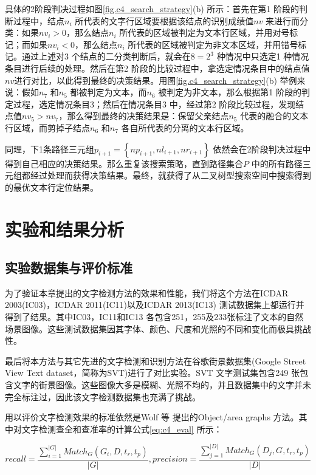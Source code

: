         具体的2阶段判决过程如图\ref{fig.c4_search_strategy}(b) 所示：首先在第1 阶段的判断过程中，结点$n_i$ 所代表的文字行区域要根据该结点的识别成绩值$nv$ 来进行而分类：如果$nv_i>0$，那么结点$n_i$ 所代表的区域被判定为文本行区域，并用对号标记；而如果$nv_i<0$，那么结点$n_i$ 所代表的区域被判定为非文本区域，并用错号标记。通过上述对3 个结点的二分类判断后，就会在$8=2^3$ 种情况中只选定1 种情况条目进行后续的处理。然后在第2 阶段的比较过程中，拿选定情况条目中的结点值$nv$进行对比，以此得到最终的决策结果。用图\ref{fig.c4_search_strategy}(b) 举例来说：假如$n_7$ 和$n_5$ 都被判定为文本，而$n_6$ 被判定为非文本，那么根据第1 阶段的判定过程，选定情况条目3；然后在情况条目3 中，经过第2 阶段比较过程，发现结点值$nv_5>nv_7$，那么得到最终的决策结果是：保留父亲结点$n_5$ 代表的融合的文本行区域，而剪掉子结点$n_6$ 和$n_7$ 各自所代表的分离的文本行区域。

        同理，下1条路径三元组$p_{i+1}=\left\{np_{i+1},nl_{i+1},nr_{i+1}\right\}$ 依然会在2阶段判决过程中得到自己相应的决策结果。那么重复该搜索策略，直到路径集合$P$ 中的所有路径三元组都经过处理而获得决策结果。最终，就获得了从二叉树型搜索空间中搜索得到的最优文本行定位结果。

    \section{实验和结果分析}

        \subsection{实验数据集与评价标准}

        为了验证本章提出的文字检测方法的效果和性能，我们将这个方法在ICDAR 2003(IC03)，ICDAR 2011(IC11)以及ICDAR 2013(IC13) 测试数据集上都运行并得到了结果。其中IC03，IC11和IC13 各包含251，255及233张标注了文本的自然场景图像。这些测试数据集因其字体、颜色、尺度和光照的不同和变化而极具挑战性。

        最后将本方法与其它先进的文字检测和识别方法在谷歌街景数据集(Google Street View Text dataset，简称为SVT)进行了对比实验。SVT 文字测试集包含249 张包含文字的街景图像。这些图像大多是模糊、光照不均的，并且数据集中的文字并未完全标注过，因此该文字检测数据集也充满了挑战。

        用以评价文字检测效果的标准依然是Wolf 等\cite{Wolf2006Object} 提出的Object/area graphs 方法。其中对文字检测查全和查准率的计算公式\ref{eq:c4_eval} 所示：

        \begin{equation}
        recall = \frac {\sum_{i=1}^{|G|}Match_G(G_i,D,t_r,t_p)} {|G|}  ,
        precision =\frac {\sum_{j=1}^{|D|}Match_G(D_j,G,t_r,t_p)} {|D|}
        \label{eq:c4_eval}
        \end{equation}

